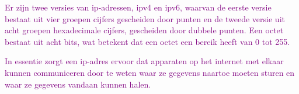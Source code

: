 \textcolor{purple}{Er zijn twee versies van \acrshort{ip}-adressen, \acrshort{ip}v4 en \acrshort{ip}v6, waarvan de eerste versie bestaat uit vier groepen cijfers gescheiden door punten en de tweede versie uit acht groepen hexadecimale cijfers, gescheiden door dubbele punten. Een octet bestaat uit acht bits, wat betekent dat een octet een bereik heeft van 0 tot 255.

\textcolor{purple}{In essentie zorgt een \acrshort{ip}-adres ervoor dat apparaten op het internet met elkaar kunnen communiceren door te weten waar ze gegevens naartoe moeten sturen en waar ze gegevens vandaan kunnen halen.}


}
